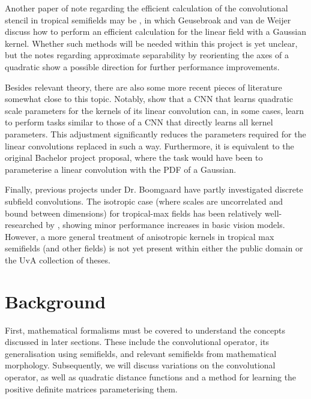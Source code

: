 \documentclass[a4paper, 12pt]{report}
\begin{document}
Another paper of note regarding the efficient calculation of the convolutional stencil in tropical semifields may be \cite{fastanifilter}, in which Geusebroak and van de Weijer discuss how to perform an efficient calculation for the linear field with a Gaussian kernel. Whether such methods will be needed within this project is yet unclear, but the notes regarding approximate separability by reorienting the axes of a quadratic show a possible direction for further performance improvements.

Besides relevant theory, there are also some more recent pieces of literature somewhat close to this topic. Notably, \cite{qlin1, qlin2} show that a CNN that learns quadratic scale parameters for the kernels of its linear convolution can, in some cases, learn to perform tasks similar to those of a CNN that directly learns all kernel parameters. This adjustment significantly reduces the parameters required for the linear convolutions replaced in such a way. Furthermore, it is equivalent to the original Bachelor project proposal, where the task would have been to parameterise a linear convolution with the PDF of a Gaussian. 

Finally, previous projects under Dr. Boomgaard have partly investigated discrete subfield convolutions. The isotropic case (where scales are uncorrelated and bound between dimensions) for tropical-max fields has been relatively well-researched by \cite{thierrybsc, koenbsc}, showing minor performance increases in basic vision models. However, a more general treatment of anisotropic kernels in tropical max semifields (and other fields) is not yet present within either the public domain or the UvA collection of theses. 

\chapter{Background}
First, mathematical formalisms must be covered to understand the concepts discussed in later sections. These include the convolutional operator, its generalisation using semifields, and relevant semifields from mathematical morphology. Subsequently, we will discuss variations on the convolutional operator, as well as quadratic distance functions and a method for learning the positive definite matrices parameterising them.
\end{document}
